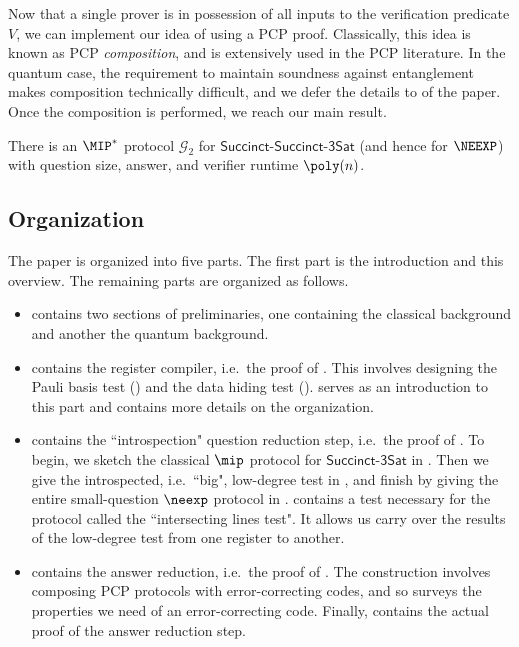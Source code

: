 \documentclass[11pt]{article}
\newcommand{\succinct}{\mathsf{Succinct}\text{-}\mathsf{3Sat}}
\newcommand{\game}{\mathscr{G}}
\begin{document}
    Now that a single prover is in possession of all inputs to the
    verification predicate $V$, we can implement our idea of using a
    PCP proof. Classically, this idea is known as PCP
    \emph{composition}, and is extensively used in the PCP
    literature. In the quantum case, the requirement to maintain soundness against
    entanglement makes composition technically difficult, and we defer
    the details to  of the paper. Once the
    composition is performed, we reach our main result.
    \begin{infthm}\label{thm:whatevewre}
      There is an $\MIP^*$ protocol $\game_{2}$ for $\mathsf{Succinct}$-$\mathsf{Succinct}$-$\mathsf{3Sat}$
      (and hence for $\NEEXP$) with
      question size, answer, and verifier runtime $\poly(n)$.
    \end{infthm}
    
\subsection{Organization}

The paper is organized into five parts.  The first part is the introduction and this overview. The remaining parts are organized as follows.
\begin{itemize}
\item {} contains two sections of preliminaries, one containing the classical background and another the quantum background.
\item {} contains the register compiler, i.e.\ the proof of .
	This involves designing the Pauli basis test () and the data hiding test ().
	 serves as an introduction to this part and contains more details on the organization.
\item {} contains the ``introspection" question reduction step, i.e.\ the proof of .
	To begin, we sketch the classical $\mip$ protocol for $\succinct$ in .
	Then we give the introspected, i.e.\ ``big", low-degree test in ,
	and finish by giving the entire small-question $\neexp$ protocol in .
	 contains a test necessary for the protocol called the ``intersecting lines test".
	It allows us carry over the results of the low-degree test from one register to another.
\item {} contains the answer reduction, i.e.\ the proof of .
	The construction involves composing PCP protocols with error-correcting codes, and so  surveys the properties we need of an error-correcting code.
	Finally,  contains the actual proof of the answer reduction step.
\end{itemize}
\end{document}

